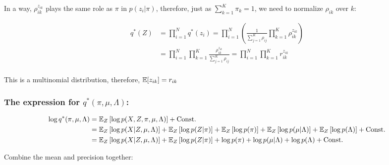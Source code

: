 \documentclass{article}
\def\C{\text{Const.}}
\begin{document}
In a way,  $\rho_{ik}^{z_{ik}}$ plays the same role as  $\pi \text{ in } p(z_i|\pi)$, therefore, just as $\sum^K_{k=1} \pi_k = 1$, we need to normalize $\rho_{ik}$ over $k$:

\begin{equation}
\begin{split}
    q^*(Z) &= \prod_{i=1}^N q^*(z_i) =  \prod^N_{i=1} \left(\frac{1}{ \sum^K_{j=1} \rho_{ij}} \prod^K_{k=1} \rho_{ik}^{z_{ik}} \right) \\
    &=  \prod^N_{i=1} \prod^K_{k=1} \frac{\rho_{ik}^{z_{ik}}}{ \sum^K_{j=1} \rho_{ij}}
    =  \prod^N_{i=1} \prod^K_{k=1} r_{ik}^{z_{ik}}\\
\end{split}
\end{equation}

This is a multinomial distribution, therefore, $\mathbb{E} [z_{ik} ] = r_{ik}$

\subsubsection{The expression for $q^*(\pi,\mu,\Lambda)$:}

\begin{equation}
\begin{split}
    \log q^*(\pi,\mu,\Lambda) &= \E_{Z} \left[ \log p (X,Z, \pi, \mu, \Lambda)  \right] + \C \\
    &= \E_{Z} \left[ \log p (X | Z, \mu, \Lambda)  \right] + \E_{Z} \left[ \log p ( Z | \pi)  \right] + \E_{Z} \left[ \log p (\pi)  \right] +\E_{Z} \left[ \log p ( \mu | \Lambda)  \right] + \E_{Z} \left[ \log p (\Lambda)  \right] + \C \\
    &= \E_{Z} \left[ \log p (X | Z, \mu, \Lambda)  \right] + \E_{Z} \left[ \log p ( Z | \pi)  \right] + \log p (\pi) + \log p ( \mu | \Lambda) + \log p (\Lambda) + \C \\
\end{split}
\end{equation}

Combine the mean and precision together:
\end{document}
